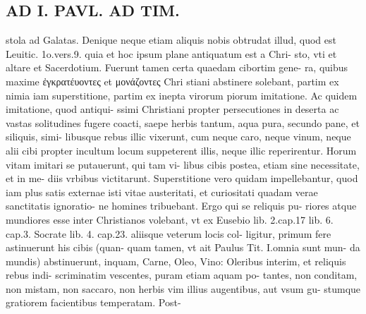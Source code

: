 \documentclass{article}
\begin{document}
\begin{pages}
\section*{AD I. PAVL. AD TIM. }
\marginpar{[ p.378 ]}\pstart stola ad Galatas. Denique neque etiam aliquis nobis obtrudat illud, quod est Leuitic. 1o.vers.9. quia et hoc ipsum plane antiquatum est a Chri- sto, vti et altare et Sacerdotium. Fuerunt tamen certa quaedam cibortim gene- ra, quibus maxime ἐγκρατέυοντες et μονάζοντες Chri stiani abstinere solebant, partim ex nimia iam superstitione, partim ex inepta virorum piorum imitatione. Ac quidem imitatione, quod antiqui- ssimi Christiani propter persecutiones in deserta ac vastas solitudines fugere coacti, saepe herbis tantum, aqua pura, secundo pane, et siliquis, simi- libusque rebus illic vixerunt, cum neque caro, neque vinum, neque alii cibi propter incultum locum suppeterent illis, neque illic reperirentur. Horum vitam imitari se putauerunt, qui tam vi- libus cibis postea, etiam sine necessitate, et in me- diis vrbibus victitarunt. Superstitione vero quidam impellebantur, quod iam plus satis externae isti vitae austeritati, et curiositati quadam verae sanctitatis ignoratio- ne homines tribuebant. Ergo qui se reliquis pu- riores atque mundiores esse inter Christianos volebant, vt ex Eusebio lib. 2.cap.17 lib.  6. cap.3. Socrate lib.  4. cap.23. aliisque veterum locis col- ligitur, primum fere astinuerunt his cibis (quan- quam tamen, vt ait Paulus Tit. I.omnia sunt mun- da mundis) abstinuerunt, inquam, Carne, Oleo, Vino: Oleribus interim, et reliquis rebus indi- scriminatim vescentes, puram etiam aquam po- tantes, non conditam, non mistam, non saccaro, non herbis vim illius augentibus, aut vsum gu- stumque gratiorem facientibus temperatam. Post-  \pend

\end{pages}
\end{document}
